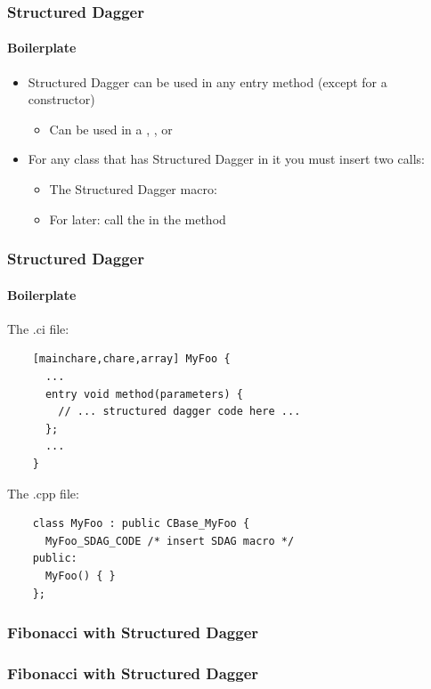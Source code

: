 \begin{frame}
  \frametitle{Structured Dagger}
  \framesubtitle{Boilerplate}
  \begin{itemize}
    \item Structured Dagger can be used in any entry method (except for a constructor)
      \begin{itemize}
      \item Can be used in a , , or 
      \end{itemize}
    \item For any class that has Structured Dagger in it you must insert two
      calls:
       \begin{itemize}
         \item The Structured Dagger macro: 
         \item For later: call the  in the  method
       \end{itemize}
  \end{itemize}
\end{frame}

\begin{frame}[fragile]
  \frametitle{Structured Dagger}
  \framesubtitle{Boilerplate}
  The .ci file:
  \begin{lstlisting}
    [mainchare,chare,array] MyFoo {
      ...
      entry void method(parameters) {
        // ... structured dagger code here ...
      };
      ...
    }
  \end{lstlisting}

  The .cpp file:
  \begin{lstlisting}
    class MyFoo : public CBase_MyFoo {
      MyFoo_SDAG_CODE /* insert SDAG macro */
    public:
      MyFoo() { }
    };
  \end{lstlisting}
\end{frame}

\begin{frame}[fragile]
  \frametitle{Fibonacci with Structured Dagger}
  
\end{frame}

\begin{frame}[fragile]
  \frametitle{Fibonacci with Structured Dagger}
  
\end{frame}


